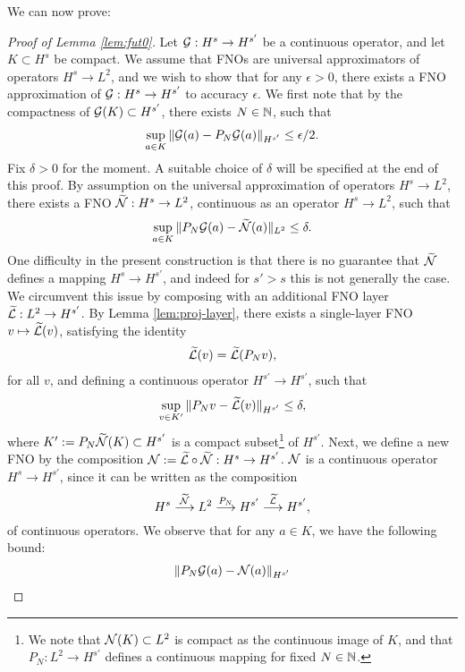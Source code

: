 \documentclass[reqno,a4paper]{amsart}
\begin{document}
We can now prove:
\begin{proof}[Proof of Lemma \ref{lem:fut0}]
Let $\mathcal{G}: H^s\to H^{s'}$ be a continuous operator, and let $K\subset H^s$ be compact. We assume that FNOs are universal approximators of operators $H^s\to L^2$, and we wish to show that for any $\epsilon > 0$, there exists a FNO approximation of $\mathcal{G}: H^s \to H^{s'}$ to accuracy $\epsilon$. We first note that by the compactness of $\mathcal{G}(K)\subset H^{s'}$, there exists $N\in \mathbb{N}$, such that 
\begin{align}\label{eq:GGNbd}
\sup_{a\in K}\Vert \mathcal{G}(a) - P_N\mathcal{G}(a) \Vert_{H^{s'}} \le \epsilon/2.
\end{align}
Fix $\delta > 0$ for the moment. A suitable choice of $\delta$ will be specified at the end of this proof. By assumption on the universal approximation of operators $H^s\to L^2$, there exists a FNO $\widetilde{\mathcal{N}}: H^s\to L^2$, continuous as an operator $H^s\to L^2$, such that 
\begin{align}\label{eq:tNbd}
\sup_{a\in K}\Vert P_N\mathcal{G}(a) - \widetilde{\mathcal{N}}(a) \Vert_{L^2} \le \delta.
\end{align}
One difficulty in the present construction is that there is no guarantee that $\widetilde{\mathcal{N}}$ defines a mapping $H^s\to H^{s'}$, and indeed for $s'>s$ this is not generally the case. We circumvent this issue by composing with an additional FNO layer $\widetilde{\mathcal{L}}: L^2 \to H^{s'}$. By Lemma \ref{lem:proj-layer}, there exists a single-layer FNO $v\mapsto \widetilde{\mathcal{L}}(v)$, satisfying the identity 
\begin{align}\label{eq:tLid}
\widetilde{\mathcal{L}}(v) = \widetilde{\mathcal{L}}(P_Nv),
\end{align}
 for all $v$, and defining a continuous operator $H^{s'}\to H^{s'}$, such that 
\begin{align}\label{eq:tLbd}
\sup_{v\in K'} \Vert P_N v - \widetilde{\mathcal{L}}(v) \Vert_{H^{s'}} \le \delta,
\end{align}
where $K' := P_N\widetilde{\mathcal{N}}(K) \subset H^{s'}$ is a compact subset\footnote{We note that $\mathcal{N}(K)\subset L^2$ is compact as the continuous image of $K$, and that $P_N: L^2\to H^{s'}$ defines a continuous mapping for fixed $N\in \mathbb{N}$.} 
of $H^{s'}$. Next, we define a new FNO by the composition $\mathcal{N} := \widetilde{\mathcal{L}}\circ \widetilde{\mathcal{N}}: H^s \to H^{s'}$. $\mathcal{N}$ is a continuous operator $H^s\to H^{s'}$, since it can be written as the composition
\[
H^s \overset{\widetilde{\mathcal{N}}}{\longrightarrow} L^2 \overset{P_N}{\longrightarrow} H^{s'} \overset{\widetilde{\mathcal{L}}}{\longrightarrow} H^{s'},
\]
of continuous operators. We observe that for any $a\in K$, we have the following bound:
\begin{align*}
\Vert P_N\cG(a) - \cN(a) \Vert_{H^{s'}}

\end{align*}
\end{proof}
\end{document}
